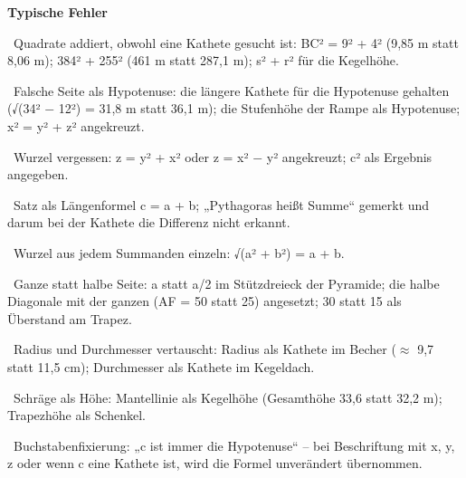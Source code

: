 \documentclass[11pt]{article}
\begin{document}
\pfheftstil
\fancyfoot[C]{\parbox[t]{\textwidth}{\mbfhbox\par\vspace{1.5mm}{\footnotesize\color{mbgrau}{\scriptsize MRD}\hfill\thepage}}}
{\small\noindent\textbf{Typische Fehler}\par\smallskip\noindent \textbullet\ Quadrate addiert, obwohl eine Kathete gesucht ist: BC² = 9² + 4² (9,85 m statt 8,06 m); 384² + 255² (461 m statt 287,1 m); s² + r² für die Kegelhöhe.\par\noindent \textbullet\ Falsche Seite als Hypotenuse: die längere Kathete für die Hypotenuse gehalten (√(34² $-$ 12²) = 31,8 m statt 36,1 m); die Stufenhöhe der Rampe als Hypotenuse; x² = y² + z² angekreuzt.\par\noindent \textbullet\ Wurzel vergessen: z = y² + x² oder z = x² $-$ y² angekreuzt; c² als Ergebnis angegeben.\par\noindent \textbullet\ Satz als Längenformel c = a + b; „Pythagoras heißt Summe“ gemerkt und darum bei der Kathete die Differenz nicht erkannt.\par\noindent \textbullet\ Wurzel aus jedem Summanden einzeln: √(a² + b²) = a + b.\par\noindent \textbullet\ Ganze statt halbe Seite: a statt a/2 im Stützdreieck der Pyramide; die halbe Diagonale mit der ganzen (AF = 50 statt 25) angesetzt; 30 statt 15 als Überstand am Trapez.\par\noindent \textbullet\ Radius und Durchmesser vertauscht: Radius als Kathete im Becher ($\approx$ 9,7 statt 11,5 cm); Durchmesser als Kathete im Kegeldach.\par\noindent \textbullet\ Schräge als Höhe: Mantellinie als Kegelhöhe (Gesamthöhe 33,6 statt 32,2 m); Trapezhöhe als Schenkel.\par\noindent \textbullet\ Buchstabenfixierung: „c ist immer die Hypotenuse“ – bei Beschriftung mit x, y, z oder wenn c eine Kathete ist, wird die Formel unverändert übernommen.\par}\medskip
\begin{pfloesung}{}
\end{pfloesung}
\begin{pfloesung}{}
\end{pfloesung}
\begin{pfloesung}{}
\end{pfloesung}
\end{document}
